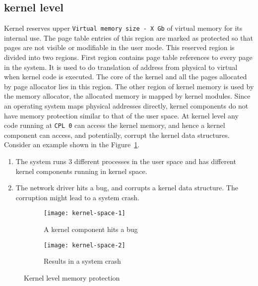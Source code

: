 \subsection{kernel level}
\label{subsec:kernel level}
Kernel reserves upper \texttt{Virtual memory size - X Gb} of virtual memory for its internal use. The page table entries of this region are marked as protected so that pages are not visible or modifiable in the user mode. This reserved region is divided into two regions. First region contains page table references to every page in the system. It is used to do translation of address from physical to virtual when kernel code is executed. The core of the kernel and all the pages allocated by page allocator lies in this region. The other region of kernel memory is used by the memory allocator, the allocated memory is mapped by kernel modules. Since an operating system maps physical addresses directly, kernel components do not have memory protection similar to that of the user space. At kernel level any code running at \texttt{CPL 0} can access the kernel memory, and hence a kernel component can access, and potentially, corrupt the kernel data structures. 
\\[3mm]
Consider an example shown in the Figure~\ref{fig:Kernel space}.
\begin{enumerate}
\item The system runs 3 different processes in the user space and has different kernel components running in kernel space.
\item The network driver hits a bug, and corrupts a kernel data structure. The corruption might lead to a system crash.
\end{enumerate}
\begin{figure}[!ht]
    \centering
    \begin{subfigure}[b]{0.49\textwidth}
	\texttt{[image: kernel-space-1]}
	\caption{A kernel component hits a bug}
    \end{subfigure}
	\hfill
    \begin{subfigure}[b]{0.49\textwidth}
	\texttt{[image: kernel-space-2]}
	\caption{Results in a system crash}
    \end{subfigure}
    \caption{Kernel level memory protection}\label{fig:Kernel space}
\end{figure}

